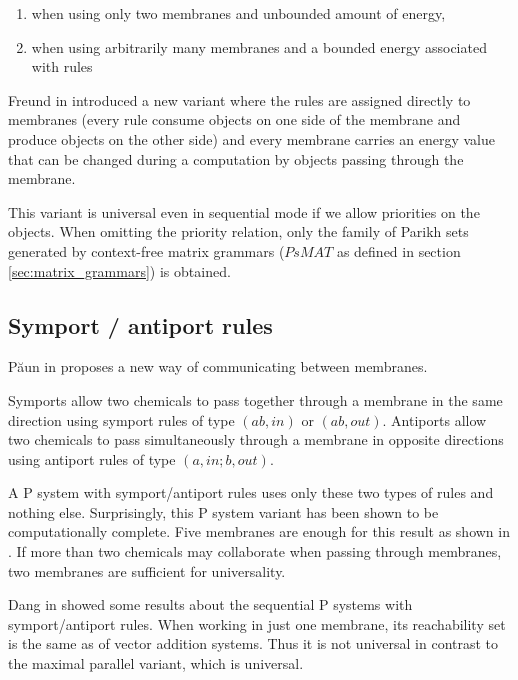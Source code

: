 \begin{enumerate}
	\item when using only two membranes and unbounded amount of energy,
	\item when using arbitrarily many membranes and a bounded energy associated with rules
\end{enumerate}

Freund in \cite{Freund:2004:SequentialEnergy} introduced a new variant where the rules are assigned directly to membranes (every rule consume objects on one side of the membrane and produce objects on the other side) and every membrane carries an energy value that can be changed during a computation by objects passing through the membrane.

This variant is universal even in sequential mode if we allow priorities on the objects. When omitting the priority relation, only the family of Parikh sets generated by context-free matrix grammars ($PsMAT$ as defined in section \ref{sec:matrix_grammars}) is obtained.


\subsection{Symport / antiport rules} %
\label{sub:symport_antiport_rules}

 P\u{a}un in \cite{Paun:2002:SymportAntiport} proposes a new way of communicating between membranes.

Symports allow two chemicals to pass together through a membrane in the same direction using symport rules of type $(ab,in)$ or $(ab,out)$.
Antiports allow two chemicals to pass simultaneously through a membrane in opposite directions using antiport rules of type $(a,in;b,out)$.

A P system with symport/antiport rules uses only these two types of rules and nothing else. Surprisingly, this P system variant has been shown to be computationally complete. Five membranes are enough for this result as shown in \cite{Paun:2002:SymportAntiport}. If more than two chemicals may collaborate when passing through membranes, two membranes are sufficient for universality.

Dang in \cite{Dang04Sequential} showed some results about the sequential P systems with symport/antiport rules. When working in just one membrane, its reachability set is the same as of vector addition systems. Thus it is not universal in contrast to the maximal parallel variant, which is universal.

